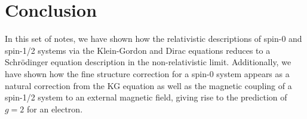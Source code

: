 \section{Conclusion}

In this set of notes, we have shown how the relativistic descriptions of spin-0 and spin-1/2 systems via the Klein-Gordon and Dirac equations reduces to a Schr\"{o}dinger equation description in the non-relativistic limit.
Additionally, we have shown how the fine structure correction for a spin-0 system appears as a natural correction from the KG equation as well as the magnetic coupling of a spin-1/2 system to an external magnetic field, giving rise to the prediction of $g = 2$ for an electron.



    

